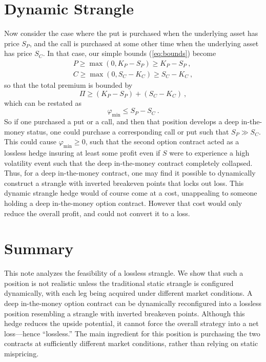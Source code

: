 \documentclass[aps,reprint]{revtex4-2}
\begin{document}
\section{Dynamic Strangle}
Now consider the case where the put is purchased when the underlying asset has price $S_P$, and the call is purchased at some other time when the underlying asset has price $S_C$.  In that case, our simple bounds (\ref{eq:bounds}) become
\begin{subequations} \label{eq:dynamicbounds}
\begin{align}
P \ge \max(0, K_P - S_P) \ge K_P - S_P~,\\
C \ge \max(0, S_C - K_C) \ge S_C - K_C~,
\end{align}
\end{subequations}
so that the total premium is bounded by
\begin{equation}
\Pi \ge (K_P - S_P) + (S_C - K_C)~,
\end{equation}
which can be restated as
\begin{equation}
\varphi_{\min} \le S_P - S_C~.
\end{equation}
So if one purchased a put or a call, and then that position develops a deep in-the-money status, one could purchase a corresponding call or put such that $S_P \gg S_C$.  This could cause $\varphi_{\min} \ge 0$, such that the second option contract acted as a lossless hedge insuring at least some profit even if $S$ were to experience a high volatility event such that the deep in-the-money contract completely collapsed.
Thus, for a deep in-the-money contract, one may find it possible to dynamically construct a strangle with inverted breakeven points that locks out loss.  This dynamic strangle hedge would of course come at a cost, unappealing to someone holding a deep in-the-money option contract. However that cost would only reduce the overall profit, and could not convert it to a loss.

\section{Summary}

This note analyzes the feasibility of a lossless strangle. We show that such a position is not realistic unless the traditional static strangle is configured dynamically, with each leg being acquired under different market conditions.  A deep in-the-money option contract can be dynamically reconfigured into a lossless position resembling a strangle with inverted breakeven points.  Although this hedge reduces the upside potential, it cannot force the overall strategy into a net loss—hence “lossless.”  The main ingredient for this position is purchasing the two contracts at sufficiently different market conditions, rather than relying on static mispricing.
\end{document}
